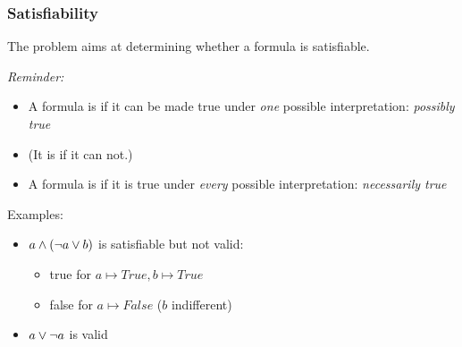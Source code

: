 \documentclass{beamer}
\begin{document}
\begin{frame}[fragile]\frametitle{Satisfiability}


The  problem aims at determining whether a formula is
satisfiable.

\emph{Reminder:}
\begin{itemize}
\item A formula is  if it can be made true under \emph{one}
  possible interpretation: \emph{possibly true}
\item (It is   if it can not.)
\item A formula is  if it is true under \emph{every}
  possible interpretation: \emph{necessarily true}
\end{itemize}

\vspace{3mm}
Examples:
\begin{itemize}
\item $a \wedge (\neg a \vee b)$ is satisfiable but not valid:
  \begin{itemize}
  \item true for $a \mapsto True, b \mapsto True$
  \item false for $a \mapsto False$ ($b$ indifferent)
  \end{itemize}
\item $a \vee \neg a$ is valid  
\end{itemize}

\end{frame}
\end{document}
